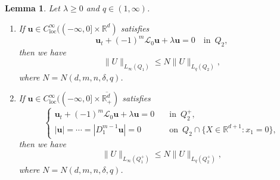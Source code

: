 \documentclass[reqno]{amsart}
\numberwithin{equation}{section}
\theoremstyle{plain}
\newtheorem{lemma}[theorem]{Lemma}
\theoremstyle{definition}
\theoremstyle{remark}
\begin{document}
\begin{lemma}		\label{0929.lem1}
Let $\lambda\ge 0$ and $q\in (1,\infty)$.
\begin{enumerate}[$(a)$]
\item
If 
${\boldsymbol{u}}\in C^\infty_{\operatorname{loc}}((-\infty,0] \times {\mathbb{R}}^d)$
satisfies
\begin{equation*}				
{\boldsymbol{u}}_t+(-1)^m{\mathcal{L}}_0{\boldsymbol{u}}+\lambda{\boldsymbol{u}}=0 \quad \text{in }\, Q_2,
\end{equation*}
then we have 
\begin{equation}		\label{1002.eq1}
\|U\|_{L_\infty(Q_1)}\le N\|U\|_{L_q(Q_2)},
\end{equation}
where $N=N(d,m,n,\delta,q)$.
\item
If 
${\boldsymbol{u}}\in C^\infty_{\operatorname{loc}}((-\infty,0] \times \overline{{\mathbb{R}}^d_+})$ satisfies
\begin{equation*}		
\left\{
\begin{aligned}
{\boldsymbol{u}}_t+(-1)^m{\mathcal{L}}_0{\boldsymbol{u}}+\lambda {\boldsymbol{u}}=0 &\quad \text{in }\, Q_2^+,\\
|{\boldsymbol{u}}| =\cdots=|D^{m-1}_1{\boldsymbol{u}}|=0 &\quad \text{on }\, Q_2 \cap \{X \in {\mathbb{R}}^{d+1}: x_1 = 0\},
\end{aligned}
\right.
\end{equation*}
then we have
$$
\|U\|_{L_\infty(Q_1^+)}\le N\|U\|_{L_q(Q_2^+)},
$$
where $N=N(d,m,n,\delta,q)$.

\end{enumerate}
\end{lemma}
\end{document}
